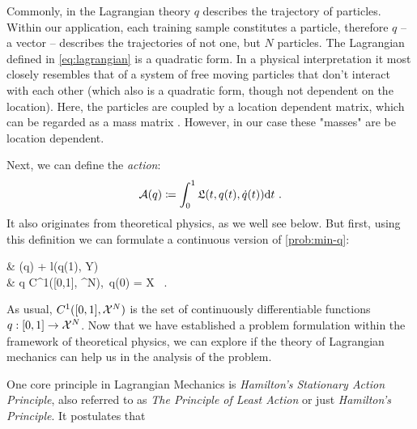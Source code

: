 Commonly, in the Lagrangian theory $q$ describes the trajectory of particles.
Within our application, each training sample constitutes a particle, therefore $q$ -- a vector -- describes the trajectories of not one, but $N$ particles.
The Lagrangian defined in \cref{eq:lagrangian} is a quadratic form.
In a physical interpretation it most closely resembles that of a system of free moving particles that don't interact with each other (which also is a quadratic form, though not dependent on the location).
Here, the particles are coupled by a location dependent matrix, which can be regarded as a mass matrix \cite{marsden10}.
However, in our case these "masses" are be location dependent.


Next, we can define the \emph{action}:
\begin{equation}
\label{eq:action}
	\cA(q) \coloneqq \int_{0}^{1} \fL(t, q(t), \dot{q}(t)) \mathrm{d}t \ .
\end{equation}
It also originates from theoretical physics, as we well see below.
But first, using this definition we can formulate a continuous version of \cref{prob:min-q}:
\begin{problem}
\label{prob:cont-least-action}
	\begin{cases}
		 & \nu \cA(q) + l(q(1), Y)\\
		 & q \in C^1([0,1], \cX^N),\ q(0) = X \ .
	\end{cases}
\end{problem}
As usual, $C^1([0,1], \mathcal{X}^N)$ is the set of continuously differentiable functions $q: [0, 1] \rightarrow \mathcal{X}^N$.
Now that we have established a problem formulation within the framework of theoretical physics, we can explore if the theory of Lagrangian mechanics can help us in the analysis of the problem.

One core principle in Lagrangian Mechanics is \emph{Hamilton's Stationary Action Principle}, also referred to as \emph{The Principle of Least Action} or just \emph{Hamilton's Principle}.
It postulates that\vspace{.5em}
\newline
{}

